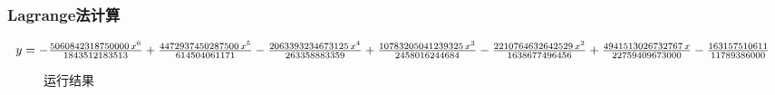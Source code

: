 \subsubsection{Lagrange法计算}

\qa 
$y=-\frac{5060842318750000\,x^6}{1843512183513}+\frac{4472937450287500\,x^5}{614504061171}-\frac{2063393234673125\,x^4}{263358883359}\\+\frac{10783205041239325\,x^3}{2458016244684}-\frac{2210764632642529\,x^2}{1638677496456}+\frac{4941513026732767\,x}{22759409673000}-\frac{163157510611}{11789386000}$
\begin{figure}[H]
	\centering
	\hfill
	\caption{运行结果}
	\label{fig:cj12}
\end{figure}
